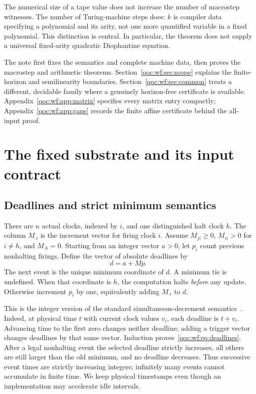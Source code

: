 \documentclass[11pt,letterpaper]{article}
\theoremstyle{definition}
\theoremstyle{remark}
\begin{document}
The numerical size of a tape value does not increase the number of macrostep witnesses. The number of Turing-machine steps does: $k$ is compiler data specifying a polynomial and its arity, not one more quantified variable in a fixed polynomial. This distinction is central. In particular, the theorem does not supply a universal fixed-arity quadratic Diophantine equation.

The note first fixes the semantics and complete machine data, then proves the macrostep and arithmetic theorems. Section~\ref{qoc:wf:sec:scope} explains the finite-horizon and semilinearity boundaries. Section~\ref{qoc:wf:sec:common} treats a different, decidable family where a genuinely horizon-free certificate is available. Appendix~\ref{qoc:wf:app:matrix} specifies every matrix entry compactly; Appendix~\ref{qoc:wf:app:gaps} records the finite affine certificate behind the all-input proof.

\section{The fixed substrate and its input contract}\label{qoc:wf:sec:substrate}
\subsection{Deadlines and strict minimum semantics}
There are $n$ actual clocks, indexed by $i$, and one distinguished halt clock $h$. The column $M_{\cdot i}$ is the increment vector for firing clock $i$. Assume $M_{ji}\ge0$, $M_{ii}>0$ for $i\ne h$, and $M_{\cdot h}=0$. Starting from an integer vector $a>0$, let $p_i$ count previous nonhalting firings. Define the vector of absolute deadlines by
\begin{equation}\label{qoc:wf:eq:deadlines}
 d=a+Mp.
\end{equation}
The next event is the unique minimum coordinate of $d$. A minimum tie is undefined. When that coordinate is $h$, the computation halts \emph{before} any update. Otherwise increment $p_i$ by one, equivalently adding $M_{\cdot i}$ to $d$.

This is the integer version of the standard simultaneous-decrement semantics~\cite{wf:waterfall}. Indeed, at physical time $t$ with current clock values $v_i$, each deadline is $t+v_i$. Advancing time to the first zero changes neither deadline; adding a trigger vector changes deadlines by that same vector. Induction proves~\eqref{qoc:wf:eq:deadlines}. After a legal nonhalting event the selected deadline strictly increases, all others are still larger than the old minimum, and no deadline decreases. Thus successive event times are strictly increasing integers; infinitely many events cannot accumulate in finite time. We keep physical timestamps even though an implementation may accelerate idle intervals.
\end{document}
